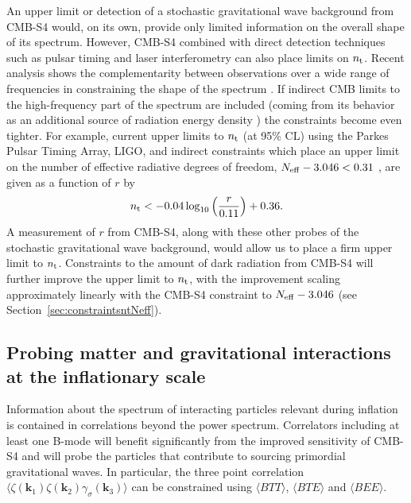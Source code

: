 An upper limit or detection of a stochastic gravitational wave background from CMB-S4 would, on its own, provide only limited information on the overall shape of its spectrum. However, CMB-S4 combined with direct detection techniques such as pulsar timing and laser interferometry can also place limits on $n_{\rm t}$. Recent analysis shows the complementarity between observations over a wide range of frequencies in constraining the shape of the spectrum \cite{Lasky:2015lej,Meerburg:2015zua}. If indirect CMB limits to the high-frequency part of the spectrum are included (coming from its behavior as an additional source of radiation energy density \cite{Smith:2006nka}) the constraints become even tighter. For example, current upper limits to $n_{\rm t}$ (at 95\% CL) using the Parkes Pulsar Timing Array, LIGO, and indirect constraints which place an upper limit on the number of effective radiative degrees of freedom, $N_{\rm eff}-3.046 < 0.31$ \cite{Pagano:2015hma}, are given as a function of $r$ by \cite{Lasky:2015lej}
\begin{equation}
n_{\rm t} < -0.04 \log_{10} \left(\frac{r}{0.11}\right) + 0.36.
\end{equation}
A measurement of $r$ from CMB-S4, along with these other probes of the stochastic gravitational wave background, would allow us to place a firm upper limit to $n_{\rm t}$.  Constraints to the amount of dark radiation from CMB-S4 will further improve the upper limit to $n_{\rm t}$, with the improvement scaling approximately linearly with the CMB-S4 constraint to $N_{\rm eff}-3.046$ \cite{Meerburg:2015zua} (see Section~\ref{sec:constraintsntNeff}).


\subsection{Probing matter and gravitational interactions at the inflationary scale}\label{subsubsec:Interactions}
\label{subsec:sst}

Information about the spectrum of interacting particles relevant during inflation is contained in correlations beyond the power spectrum. Correlators including at least one B-mode will benefit significantly from the improved sensitivity of CMB-S4 and will probe the particles that contribute to sourcing primordial gravitational waves. In particular, the three point correlation $\langle \zeta(\mathbf{k}_1)\zeta(\mathbf{k}_2)\gamma_\sigma(\mathbf{k}_3) \rangle$ can be constrained using $\langle BTT\rangle$, $\langle BTE\rangle $ and $\langle BEE\rangle$.


